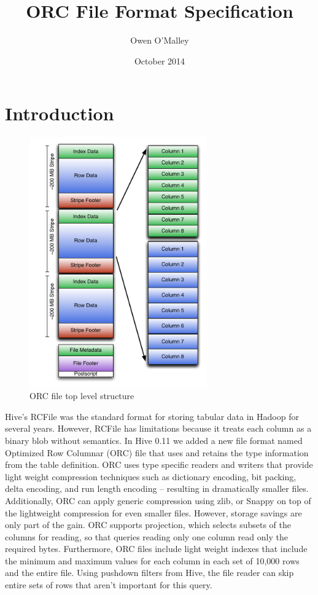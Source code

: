 \documentclass{article}
\title{ORC File Format Specification}
\author{Owen O'Malley}
\date{October 2014}
\begin{document}
\maketitle

\section{Introduction}

\begin{figure}
  \centering
  \includegraphics[width=3in]{ORCFileStructure.pdf}
  \caption{ORC file top level structure}
  \label{orc-structure}
  \vspace{-20pt}
\end{figure}

Hive's RCFile was the standard format for storing tabular data in
Hadoop for several years. However, RCFile has limitations because it
treats each column as a binary blob without semantics. In Hive 0.11 we
added a new file format named Optimized Row Columnar (ORC) file that
uses and retains the type information from the table definition. ORC
uses type specific readers and writers that provide light weight
compression techniques such as dictionary encoding, bit packing, delta
encoding, and run length encoding -- resulting in dramatically smaller
files. Additionally, ORC can apply generic compression using zlib, or
Snappy on top of the lightweight compression for even smaller
files. However, storage savings are only part of the gain. ORC
supports projection, which selects subsets of the columns for reading,
so that queries reading only one column read only the required
bytes. Furthermore, ORC files include light weight indexes that
include the minimum and maximum values for each column in each set of
10,000 rows and the entire file. Using pushdown filters from Hive, the
file reader can skip entire sets of rows that aren't important for
this query.
\end{document}
